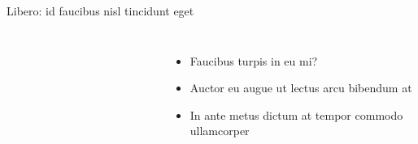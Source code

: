 \begin{frame}{Libero: id faucibus nisl tincidunt eget}
    \begin{columns}
    \begin{figure}
        \centering
        \qquad
    \end{figure}
    \vspace{-2em}
    \begin{figure}
        \centering
        \qquad
    \end{figure}
    \begin{itemize}
        \item Faucibus turpis in eu mi?
        \item Auctor eu augue ut lectus arcu bibendum at
        \item In ante metus dictum at tempor commodo ullamcorper\cite{spencer_can_2023}
    \end{itemize}
    \end{columns}
\end{frame}
